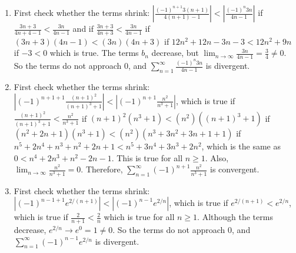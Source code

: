 \begin{Answer}[ref = alt1]
\begin{enumerate}
\item First check whether the terms shrink: $\left| \frac{(-1)^{n+1} 3(n+1)}{4(n+1)-1} 
\right| < \left| \frac{(-1)^n 3n}{4n-1} \right|$ if $\frac{3n+3}{4n+4-1} < 
\frac{3n}{4n-1}$ and if $\frac{3n+3}{4n+3} < \frac{3n}{4n-1}$ if $(3n+3)(4n-1) 
< (3n)(4n+3)$ if $12n^2 + 12n - 3n - 3 < 12n^2 + 9n$ if $-3 < 0$ which is true. 
The terms $b_n$ decrease, but $\lim_{n \to \infty} \frac{3n}{4n-1} = \frac{3}{4} \neq 0$. So the terms do not approach 0, and $\sum_{n=1}^\infty \frac{(-1)^n 3n}{4n-1}$ is divergent. 
\item First check whether the terms shrink: $\left| (-1)^{n+1+1} \frac{(n+1)^2}{(n+1)^3 
+ 1} \right| < \left| (-1)^{n+1} \frac{n^2}{n^3 + 1} \right|$, which is true if 
$\frac{(n+1)^2}{(n+1)^3 + 1} < \frac{n^2}{n^3 + 1}$ if $(n+1)^2 (n^3 + 1) < 
(n^2) ((n+1)^3+1)$ if $(n^2 + 2n + 1)(n^3 + 1) < (n^2) (n^3 + 3n^2 + 3n + 1 + 1)$ 
if $n^5 + 2n^4 + n^3 + n^2 + 2n + 1 < n^5 + 3n^4 + 3n^3 + 2n^2$, which is the same as $0 < n^4 + 2n^3 + n^2 - 2n - 1$. This is true for all $n \geq 
1$. Also, $\lim_{n \to \infty} \frac{n^2}{n^3 + 1} = 0$. Therefore, $\sum_{n=1}^\infty (-1)^{n+1} \frac{n^2}{n^3 + 1}$ is convergent.
\item First check whether the terms shrink: $\left| (-1)^{n-1+1} e^{2/(n+1)} \right| < 
\left| (-1)^{n - 1} e^{2/n} \right|$, which is true if $e^{2/(n+1)} < e^{2/n}$, 
which is true if $\frac{2}{n+1} < \frac{2}{n}$ which is true for all $n \geq 1$. 
Although the terms decrease, $e^{2/n} \to e^0 = 1 \neq 0$. So the terms do not approach 0, and $\sum_{n=1}^\infty (-1)^{n-1} e^{2/n}$ is divergent. 
\end{enumerate}
\end{Answer}







